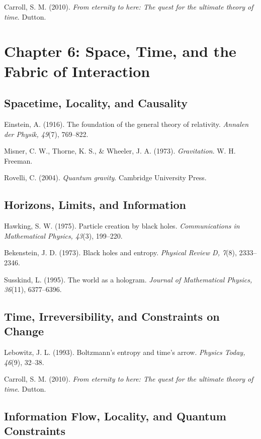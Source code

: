 \documentclass[
  openright]{book}
\begin{document}
Carroll, S. M. (2010). \emph{From eternity to here: The quest for the
ultimate theory of time}. Dutton.

\section{Chapter 6: Space, Time, and the Fabric of
Interaction}\label{chapter-6-space-time-and-the-fabric-of-interaction}

\subsection{Spacetime, Locality, and
Causality}\label{spacetime-locality-and-causality}

Einstein, A. (1916). The foundation of the general theory of relativity.
\emph{Annalen der Physik, 49}(7), 769--822.

Misner, C. W., Thorne, K. S., \& Wheeler, J. A. (1973).
\emph{Gravitation}. W. H. Freeman.

Rovelli, C. (2004). \emph{Quantum gravity}. Cambridge University Press.

\subsection{Horizons, Limits, and
Information}\label{horizons-limits-and-information}

Hawking, S. W. (1975). Particle creation by black holes.
\emph{Communications in Mathematical Physics, 43}(3), 199--220.

Bekenstein, J. D. (1973). Black holes and entropy. \emph{Physical Review
D, 7}(8), 2333--2346.

Susskind, L. (1995). The world as a hologram. \emph{Journal of
Mathematical Physics, 36}(11), 6377--6396.

\subsection{Time, Irreversibility, and Constraints on
Change}\label{time-irreversibility-and-constraints-on-change}

Lebowitz, J. L. (1993). Boltzmann's entropy and time's arrow.
\emph{Physics Today, 46}(9), 32--38.

Carroll, S. M. (2010). \emph{From eternity to here: The quest for the
ultimate theory of time}. Dutton.

\subsection{Information Flow, Locality, and Quantum
Constraints}\label{information-flow-locality-and-quantum-constraints}
\end{document}
